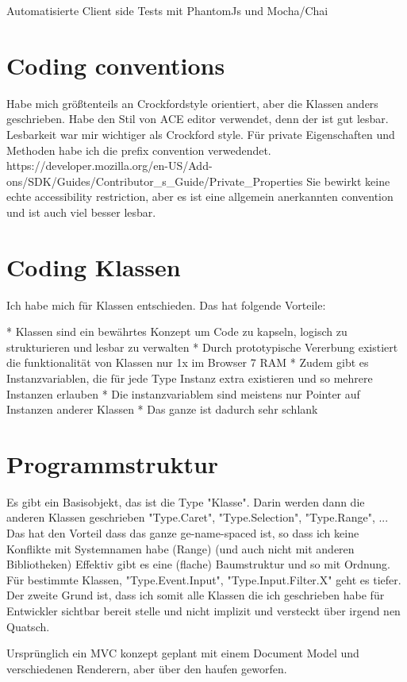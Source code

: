 Automatisierte Client side Tests mit PhantomJs und Mocha/Chai


\section{Coding conventions}

Habe mich größtenteils an Crockfordstyle orientiert, aber die Klassen anders geschrieben. Habe den Stil von ACE editor verwendet, denn der ist gut lesbar. Lesbarkeit war mir wichtiger als Crockford style. Für private Eigenschaften und Methoden habe ich die prefix convention verwedendet.
https://developer.mozilla.org/en-US/Add-ons/SDK/Guides/Contributor\_s\_Guide/Private\_Properties
Sie bewirkt keine echte accessibility restriction, aber es ist eine allgemein anerkannten convention und ist auch viel besser lesbar.

\section{Coding Klassen}

Ich habe mich für Klassen entschieden. Das hat folgende Vorteile:

* Klassen sind ein bewährtes Konzept um Code zu kapseln, logisch zu strukturieren und lesbar zu verwalten
* Durch prototypische Vererbung existiert die funktionalität von Klassen nur 1x im Browser 7 RAM
* Zudem gibt es Instanzvariablen, die für jede Type Instanz extra existieren und so mehrere Instanzen erlauben
* Die instanzvariablem sind meistens nur Pointer auf Instanzen anderer Klassen
* Das ganze ist dadurch sehr schlank

\section{Programmstruktur}

Es gibt ein Basisobjekt, das ist die Type "Klasse".
Darin werden dann die anderen Klassen geschrieben "Type.Caret", "Type.Selection", "Type.Range", ...
Das hat den Vorteil dass das ganze ge-name-spaced ist, so dass ich keine Konflikte mit Systemnamen habe (Range) (und auch nicht mit anderen Bibliotheken)
Effektiv gibt es eine (flache) Baumstruktur und so mit Ordnung. Für bestimmte Klassen, "Type.Event.Input", "Type.Input.Filter.X" geht es tiefer.
Der zweite Grund ist, dass ich somit alle Klassen die ich geschrieben habe für Entwickler sichtbar bereit stelle und nicht implizit und versteckt über irgend nen Quatsch.

Ursprünglich ein MVC konzept geplant mit einem Document Model und verschiedenen Renderern, aber über den haufen geworfen.

